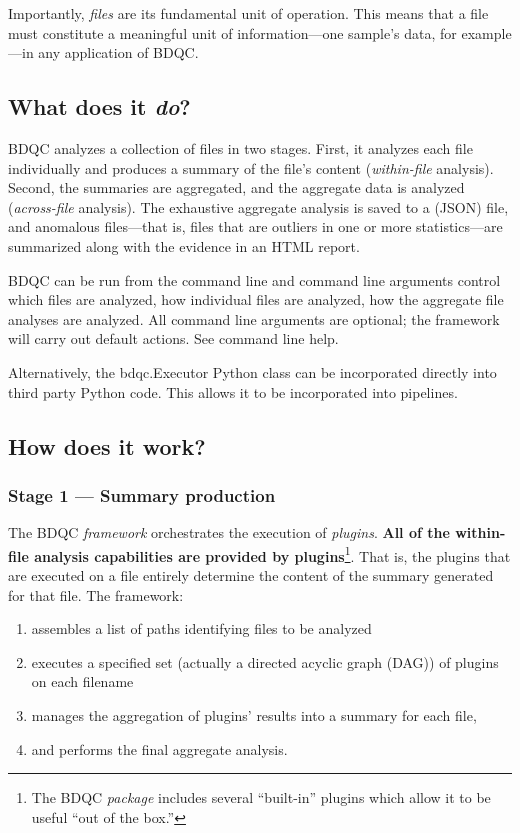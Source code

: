 \documentclass {article}
\begin{document}
Importantly, \emph{files} are its fundamental unit of operation.
This means that a file must constitute a meaningful unit of
information---one sample's data, for example---in any application of BDQC. %

\subsection{What does it \emph{do}?}

BDQC analyzes a collection of files in two stages.
First, it analyzes each file individually and produces a summary of the
file's content (\emph{within-file} analysis). Second, the summaries are
aggregated, and the aggregate data is analyzed (\emph{across-file}
analysis). The exhaustive aggregate analysis is saved to a (JSON) file,
and anomalous files---that is, files that are outliers in one or more
statistics---are summarized along with the evidence in an HTML report. 

BDQC can be run from the command line and command line arguments control
which files are analyzed,
how individual files are analyzed,
how the aggregate file analyses are analyzed.
All command line arguments are optional; the framework will carry out
default actions. See command line help.

Alternatively, the bdqc.Executor Python class can be incorporated directly
into third party Python code. This allows it to be incorporated into
pipelines.

\subsection{How does it work?}
\subsubsection{Stage 1 --- Summary production}

The BDQC \emph{framework} orchestrates the execution of \emph{plugins}.
{\bf All of the within-file analysis capabilities are provided by
plugins}\footnote{The BDQC \emph{package} includes several
``built-in'' plugins which allow it to be useful ``out of the box.''}.
That is, the plugins that are executed on a file entirely determine the
content of the summary generated for that file.
The framework:
\begin{enumerate}
\item assembles a list of paths identifying files to be analyzed
\item executes a specified set (actually a directed acyclic graph (DAG))
		of plugins on each filename
\item manages the aggregation of plugins' results into a summary for each file,
\item and performs the final aggregate analysis.
\end{enumerate}
\end{document}
